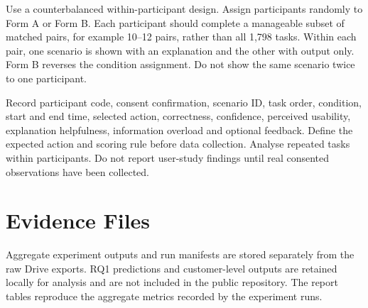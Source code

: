 Use a counterbalanced within-participant design. Assign participants randomly to Form A or Form B. Each participant should complete a manageable subset of matched pairs, for example 10--12 pairs, rather than all 1,798 tasks. Within each pair, one scenario is shown with an explanation and the other with output only. Form B reverses the condition assignment. Do not show the same scenario twice to one participant.

Record participant code, consent confirmation, scenario ID, task order, condition, start and end time, selected action, correctness, confidence, perceived usability, explanation helpfulness, information overload and optional feedback. Define the expected action and scoring rule before data collection. Analyse repeated tasks within participants. Do not report user-study findings until real consented observations have been collected.

\section{Evidence Files}
Aggregate experiment outputs and run manifests are stored separately from the raw Drive exports. RQ1 predictions and customer-level outputs are retained locally for analysis and are not included in the public repository. The report tables reproduce the aggregate metrics recorded by the experiment runs.